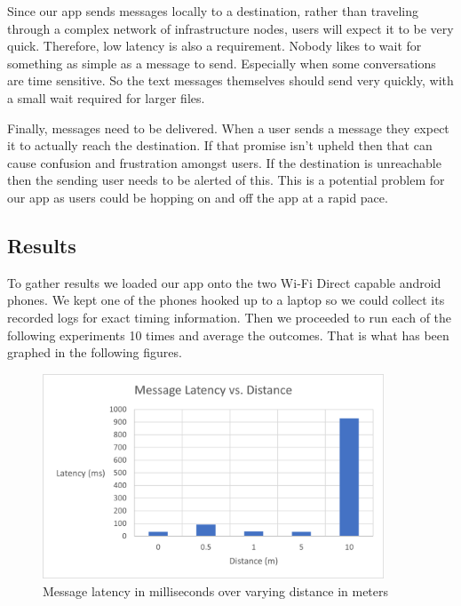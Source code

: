 \documentclass[10pt]{article}
\begin{document}
Since our app sends messages locally to a destination, rather than traveling through a complex network of infrastructure nodes, users will expect it to be very quick. Therefore, low latency is also a requirement. Nobody likes to wait for something as simple as a message to send. Especially when some conversations are time sensitive. So the text messages themselves should send very quickly, with a small wait required for larger files.

Finally, messages need to be delivered. When a user sends a message they expect it to actually reach the destination. If that promise isn't upheld then that can cause confusion and frustration amongst users. If the destination is unreachable then the sending user needs to be alerted of this. This is a potential problem for our app as users could be hopping on and off the app at a rapid pace.

\subsection{Results}

To gather results we loaded our app onto the two Wi-Fi Direct capable android phones. We kept one of the phones hooked up to a laptop so we could collect its recorded logs for exact timing information. Then we proceeded to run each of the following experiments 10 times and average the outcomes. That is what has been graphed in the following figures.

\begin{figure}[h!]
    \centering
    \includegraphics[width=4in]{message_latency_graph.png}
    \caption{Message latency in milliseconds over varying distance in meters}
    \label{results:message_latency}
\end{figure}
\end{document}
